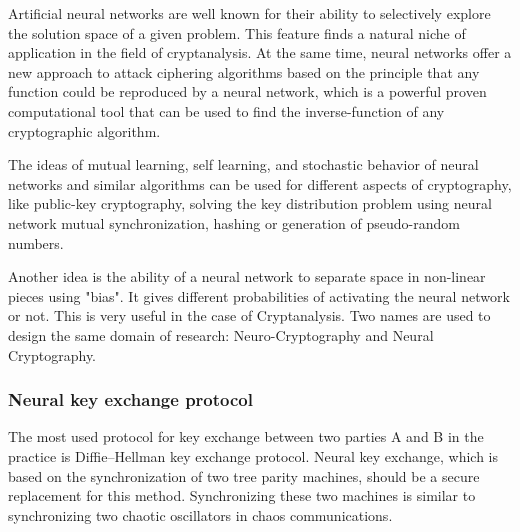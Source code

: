 \documentclass[a4paper]{article}
\begin{document}
    Artificial neural networks are well known for their ability to selectively explore the 
    solution space of a given problem. This feature finds a natural niche of application in 
    the field of cryptanalysis. At the same time, neural networks offer a new approach to attack 
    ciphering algorithms based on the principle that any function could be reproduced by a 
    neural network, which is a powerful proven computational tool that can be used to find 
    the inverse-function of any cryptographic algorithm.

    The ideas of mutual learning, self learning, and stochastic behavior of neural networks 
    and similar algorithms can be used for different aspects of cryptography, like public-key 
    cryptography, solving the key distribution problem using neural network mutual 
    synchronization, hashing or generation of pseudo-random numbers.

    Another idea is the ability of a neural network to separate space in non-linear pieces 
    using "bias". It gives different probabilities of activating the neural network or not. 
    This is very useful in the case of Cryptanalysis. 
    Two names are used to design the same domain of research: Neuro-Cryptography and Neural 
    Cryptography.

      \subsubsection{Neural key exchange protocol}
      The most used protocol for key exchange between two parties A and B in the practice 
      is Diffie–Hellman key exchange protocol. Neural key exchange, which is based on the 
      synchronization of two tree parity machines, should be a secure replacement for this method. 
      Synchronizing these two machines is similar to synchronizing two chaotic oscillators 
      in chaos communications.
\end{document}
